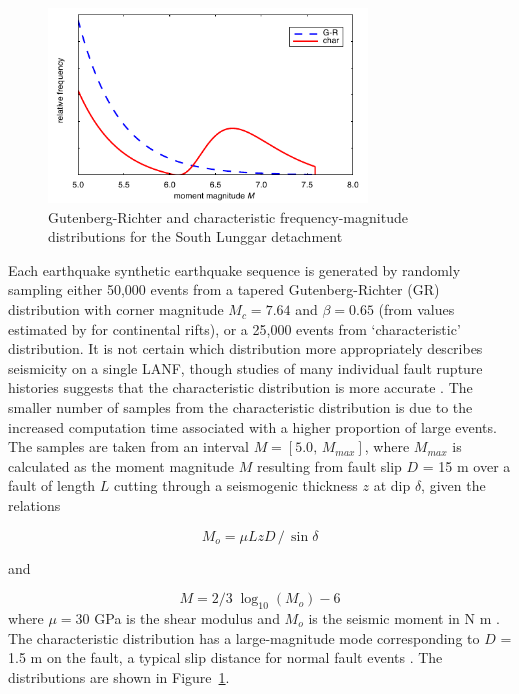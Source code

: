 \documentclass[draft,grl]{AGUTeX}
\begin{document}
\begin{article}
\begin{figure}[b!]
\noindent\includegraphics[width=20pc]{./figures/F-Ms.pdf}
\caption{Gutenberg-Richter and characteristic frequency-magnitude 
 		 distributions for the South Lunggar detachment}
\label{fig:fms}
\end{figure}

Each earthquake synthetic earthquake sequence is generated by
randomly sampling either 50,000 events from a tapered Gutenberg-Richter (GR)
distribution with corner magnitude $M_c = 7.64$ and $\beta = 0.65$
(from values estimated by \citet{birdkagan2004f_m} for continental
rifts), or a 25,000 events from `characteristic' distribution. It is not
certain which distribution more appropriately describes seismicity on a single
LANF, though studies of many individual fault rupture histories suggests
that the characteristic distribution is more accurate \citep{hecker2013eqdist}.
The smaller number of samples from the characteristic distribution is due to 
the increased computation time associated with a higher proportion of large 
events.  The samples are taken 
from an interval $M = [5.0, \, M_{max}]$, where $M_{max}$ is calculated as the
moment magnitude $M$ resulting from fault slip $D$ = 15 m over a fault of
length $L$ cutting through a seismogenic thickness $z$ at dip $\delta$,
given the relations

\begin{equation}
 M_o = \mu L z D \,/ \, \sin \delta 
 \end{equation}

and

\begin{equation}
M = 2/3 \; \log_{10} (M_o) - 6
\end{equation}
where $\mu = 30$ GPa is the shear modulus and $M_o$ is the seismic
moment in N m \citep{kagan2003pepi}.  The characteristic distribution has a
large-magnitude mode corresponding to $D$ = 1.5 m on the fault, a typical
slip distance for normal fault events \citep[e.g.][]{wesnousky2008displacement}.
The distributions are shown in Figure~\ref{fig:fms}.


\end{article}
\end{document}
